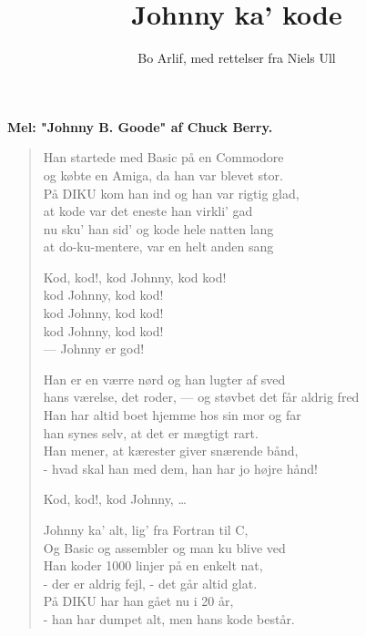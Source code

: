 \documentclass[a4paper,11pt]{article}
\title{Johnny ka' kode}
\author{Bo Arlif, med rettelser fra Niels Ull}
\begin{document}
\maketitle

\begin{center}
{\bf Mel: "Johnny B. Goode" af Chuck Berry.}
\end{center}


\begin{verse}
Han startede med Basic på en Commodore\\
og købte en Amiga, da han var blevet  stor.\\
På DIKU kom han ind og han var rigtig glad,\\
at kode var det eneste han virkli' gad\\
nu sku' han sid' og kode hele natten lang\\
at do-ku-mentere, var en helt anden sang

Kod, kod!, kod Johnny, kod kod!\\
kod Johnny, kod kod!\\
kod Johnny, kod kod!\\
kod Johnny, kod kod!\\
--- Johnny er god!

Han er en værre nørd og han lugter af sved\\
hans værelse, det roder, --- og støvbet det får aldrig fred\\
Han har altid boet hjemme hos sin mor og far\\
han synes selv, at det er mægtigt rart.\\
Han mener, at kærester giver snærende bånd,\\
- hvad skal han med dem, han har jo højre hånd!

Kod, kod!, kod Johnny, \dots

Johnny ka' alt, lig' fra Fortran til C,\\
Og Basic og assembler og man ku blive ved\\
Han koder 1000 linjer på en enkelt nat,\\
- der er aldrig fejl, - det går altid glat.\\
På DIKU har han gået nu i 20 år,\\
- han har dumpet alt, men hans kode består.\\
\end{verse}
\end{document}
